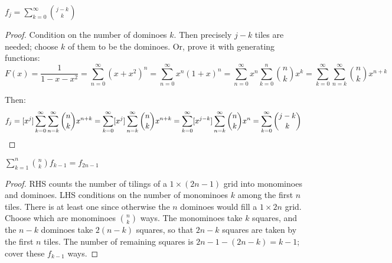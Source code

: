 \documentclass[a4paper]{article}
\begin{document}
\begin{lemma}
$f_j=\sum_{k=0}^\infty\binom{j-k}k$

\begin{hl}
\begin{proof}
Condition on the number of dominoes $k$. Then precisely $j-k$ tiles are needed; choose $k$ of them to be the dominoes. Or, prove it with generating functions:
\begin{equation*}
F(x)
=\frac1{1-x-x^2}
=\sum_{n=0}^\infty(x+x^2)^n
=\sum_{n=0}^\infty x^n(1+x)^n
=\sum_{n=0}^\infty x^n\sum_{k=0}^n\binom nkx^k
=\sum_{k=0}^\infty\sum_{n=k}^\infty\binom nkx^{n+k}
\end{equation*}

Then:
\begin{equation*}
f_j
=[x^j]\sum_{k=0}^\infty\sum_{n=k}^\infty\binom nkx^{n+k}
=\sum_{k=0}^\infty[x^j]\sum_{n=k}^\infty\binom nkx^{n+k}
=\sum_{k=0}^\infty[x^{j-k}]\sum_{n=k}^\infty\binom nkx^n
=\sum_{k=0}^\infty\binom{j-k}k\qedhere
\end{equation*}
\end{proof}
\end{hl}
\end{lemma}

\begin{lemma}
$\displaystyle\sum_{k=1}^n\binom nkf_{k-1}=f_{2n-1}$

\begin{hl}
\begin{proof}
RHS counts the number of tilings of a $1\times(2n-1)$ grid into monominoes and dominoes. LHS conditions on the number of monominoes $k$ among the first $n$ tiles. There is at least one since otherwise the $n$ dominoes would fill a $1\times 2n$ grid. Choose which are monominoes $\binom nk$ ways. The monominoes take $k$ squares, and the $n-k$ dominoes take $2(n-k)$ squares, so that $2n-k$ squares are taken by the first $n$ tiles. The number of remaining squares is $2n-1-(2n-k)=k-1$; cover these $f_{k-1}$ ways.
\end{proof}
\end{hl}
\end{lemma}
\end{document}

